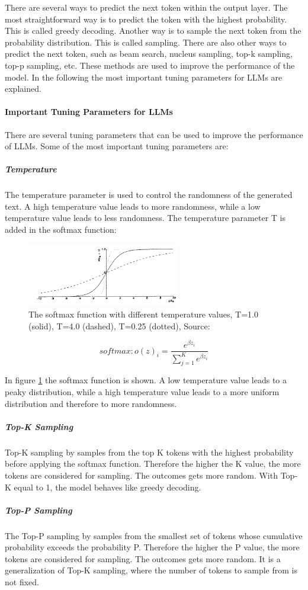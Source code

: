 There are several ways to predict the next token within the output layer. The most straightforward way is to predict the token with the highest probability. This is called greedy decoding. Another way is to sample the next token from the probability distribution. This is called sampling. There are also other ways to predict the next token, such as beam search, nucleus sampling, top-k sampling, top-p sampling, etc. These methods are used to improve the performance of the model. In the following the most important tuning parameters for LLMs are explained.

\paragraph{Important Tuning Parameters for LLMs}

There are several tuning parameters that can be used to improve the performance of LLMs. Some of the most important tuning parameters are:

\subparagraph{Temperature}
The temperature parameter is used to control the randomness of the generated text. A high temperature value leads to more randomness, while a low temperature value leads to less randomness. The temperature parameter T is added in the softmax function:

\begin{figure}[h!]
    \centering
    \includegraphics[width=0.6\textwidth]{images/temperature.png}
    \caption{The softmax function with different temperature values, T=1.0 (solid), T=4.0 (dashed), T=0.25 (dotted), Source: \citet{ACKLEY.1985}}
    \label{fig:temperature}
\end{figure}

$$softmax: o(z)_i = \frac{e^{\beta z_i}}{\sum_{j=1}^K e^{\beta z_i}}$$

In figure \ref{fig:temperature} the softmax function is shown. A low temperature value leads to a peaky distribution, while a high temperature value leads to a more uniform distribution and therefore to more randomness.


\subparagraph{Top-K Sampling}
Top-K sampling by \citet{Fan.13.05.2018} samples from the top K tokens with the highest probability before applying the softmax function. Therefore the higher the K value, the more tokens are considered for sampling. The outcomes gets more random. With Top-K equal to 1, the model behaves like greedy decoding.

\subparagraph{Top-P Sampling}
The Top-P sampling by \citet{Holtzman.22.04.2019} samples from the smallest set of tokens whose cumulative probability exceeds the probability P. Therefore the higher the P value, the more tokens are considered for sampling. The outcomes gets more random. It is a generalization of Top-K sampling, where the number of tokens to sample from is not fixed.